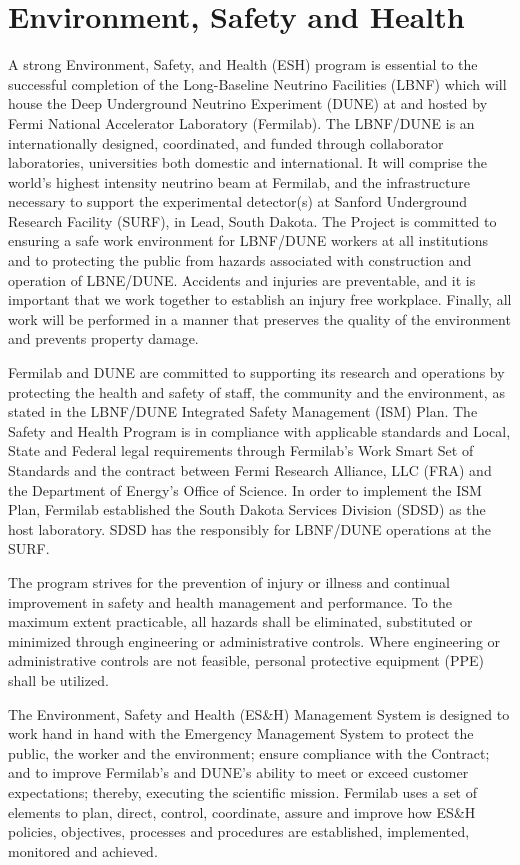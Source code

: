 \chapter{Environment, Safety and Health}
\label{vl:tc-ESH}


A strong Environment, Safety, and Health (ESH) program is essential to
the successful completion of the Long-Baseline Neutrino Facilities
(LBNF) which will house the Deep Underground Neutrino Experiment
(DUNE) at and hosted by Fermi National Accelerator Laboratory
(Fermilab).  The LBNF/DUNE is an internationally designed,
coordinated, and funded through collaborator laboratories,
universities both domestic and international.  It will comprise the
world's highest intensity neutrino beam at Fermilab, and the
infrastructure necessary to support the experimental detector(s) at
Sanford Underground Research Facility (SURF), in Lead, South Dakota.
The Project is committed to ensuring a safe work environment for
LBNF/DUNE workers at all institutions and to protecting the public
from hazards associated with construction and operation of LBNE/DUNE.
Accidents and injuries are preventable, and it is important that we
work together to establish an injury free workplace.  Finally, all
work will be performed in a manner that preserves the quality of the
environment and prevents property damage.

Fermilab and DUNE are committed to supporting its research and
operations by protecting the health and safety of staff, the community
and the environment, as stated in the LBNF/DUNE Integrated Safety
Management (ISM) Plan. The Safety and Health Program is in compliance
with applicable standards and Local, State and Federal legal
requirements through Fermilab's Work Smart Set of Standards and the
contract between Fermi Research Alliance, LLC (FRA) and the Department
of Energy's Office of Science.  In order to implement the ISM Plan,
Fermilab established the South Dakota Services Division (SDSD) as the
host laboratory.  SDSD has the responsibly for LBNF/DUNE operations at
the SURF.

The program strives for the prevention of injury or illness and
continual improvement in safety and health management and performance.
To the maximum extent practicable, all hazards shall be eliminated,
substituted or minimized through engineering or administrative
controls.  Where engineering or administrative controls are not
feasible, personal protective equipment (PPE) shall be utilized.

The Environment, Safety and Health (ES\&H) Management System is
designed to work hand in hand with the Emergency Management System to
protect the public, the worker and the environment; ensure compliance
with the Contract; and to improve Fermilab's and DUNE's ability to
meet or exceed customer expectations; thereby, executing the
scientific mission.  Fermilab uses a set of elements to plan, direct,
control, coordinate, assure and improve how ES\&H policies, objectives,
processes and procedures are established, implemented, monitored and
achieved.

